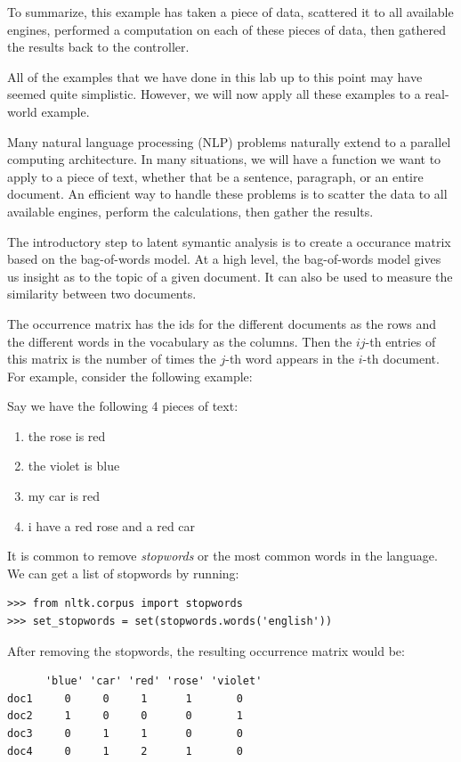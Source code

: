 To summarize, this example has taken a piece of data, scattered it to all available engines, performed a computation on each of these pieces of data, then gathered the results back to the controller.

\begin{problem}
All of the examples that we have done in this lab up to this point may have seemed quite simplistic. However, we will now apply all these examples to a real-world example.

Many natural language processing (NLP) problems naturally extend to a parallel computing architecture. In many situations, we will have a function we want to apply to a piece of text, whether that be a sentence, paragraph, or an entire document. An efficient way to handle these problems is to scatter the data to all available engines, perform the calculations, then gather the results.

The introductory step to latent symantic analysis is to create a occurance matrix based on the bag-of-words model. At a high level, the bag-of-words model gives us insight as to the topic of a given document. It can also be used to measure the similarity between two documents.

The occurrence matrix has the ids for the different documents as the rows and the different words in the vocabulary as the columns. Then the $ij$-th entries of this matrix is the number of times the $j$-th word appears in the $i$-th document. For example, consider the following example:

Say we have the following 4 pieces of text:
\begin{enumerate}
    \item the rose is red
    \item the violet is blue
    \item my car is red
    \item i have a red rose and a red car
\end{enumerate}

It is common to remove \emph{stopwords} or the most common words in the language. We can get a list of stopwords by running:
\begin{lstlisting}
>>> from nltk.corpus import stopwords
>>> set_stopwords = set(stopwords.words('english'))
\end{lstlisting}

After removing the stopwords, the resulting occurrence matrix would be:
\begin{lstlisting}
      'blue' 'car' 'red' 'rose' 'violet'
doc1     0     0     1      1       0
doc2     1     0     0      0       1
doc3     0     1     1      0       0
doc4     0     1     2      1       0
\end{lstlisting}


\end{problem}
